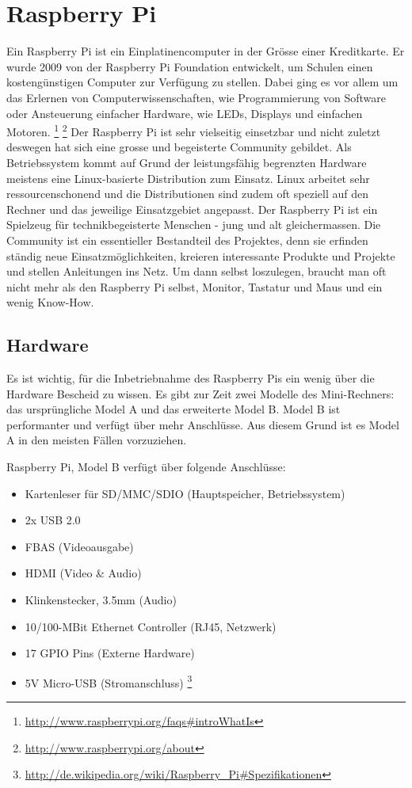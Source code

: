 \section{Raspberry Pi}
Ein Raspberry Pi ist ein Einplatinencomputer in der Grösse einer Kreditkarte.
Er wurde 2009 von der Raspberry Pi Foundation entwickelt, um Schulen einen kostengünstigen Computer zur Verfügung zu stellen.
Dabei ging es vor allem um das Erlernen von Computerwissenschaften, wie Programmierung von Software oder Ansteuerung einfacher Hardware, wie LEDs, Displays und einfachen Motoren.
\footnote{\url{http://www.raspberrypi.org/faqs\#introWhatIs}}
\footnote{\url{http://www.raspberrypi.org/about}}
Der Raspberry Pi ist sehr vielseitig einsetzbar und nicht zuletzt deswegen hat sich eine grosse und begeisterte Community gebildet. Als Betriebssystem kommt auf Grund der leistungsfähig begrenzten Hardware meistens eine Linux-basierte Distribution zum Einsatz. Linux arbeitet sehr ressourcenschonend und die Distributionen sind zudem oft speziell auf den Rechner und das jeweilige Einsatzgebiet angepasst.
Der Raspberry Pi ist ein Spielzeug für technikbegeisterte Menschen - jung und alt gleichermassen. Die Community ist ein essentieller Bestandteil des Projektes, denn sie erfinden ständig neue Einsatzmöglichkeiten, kreieren interessante Produkte und Projekte und stellen Anleitungen ins Netz. Um dann selbst loszulegen, braucht man oft nicht mehr als den Raspberry Pi selbst, Monitor, Tastatur und Maus und ein wenig Know-How.

\subsection{Hardware}
Es ist wichtig, für die Inbetriebnahme des Raspberry Pis ein wenig über die Hardware Bescheid zu wissen.
Es gibt zur Zeit zwei Modelle des Mini-Rechners: das ursprüngliche Model A und das erweiterte Model B. Model B ist performanter und verfügt über mehr Anschlüsse. Aus diesem Grund ist es Model A in den meisten Fällen vorzuziehen.

Raspberry Pi, Model B verfügt über folgende Anschlüsse:

\begin{itemize}
  \item Kartenleser für SD/MMC/SDIO (Hauptspeicher, Betriebssystem)
  \item 2x USB 2.0
  \item FBAS (Videoausgabe)
  \item HDMI (Video \& Audio)
  \item Klinkenstecker, 3.5mm (Audio)
  \item 10/100-MBit Ethernet Controller (RJ45, Netzwerk)
  \item 17 GPIO Pins (Externe Hardware)
  \item 5V Micro-USB (Stromanschluss)
\footnote{\url{http://de.wikipedia.org/wiki/Raspberry_Pi\#Spezifikationen}}
\end{itemize}

